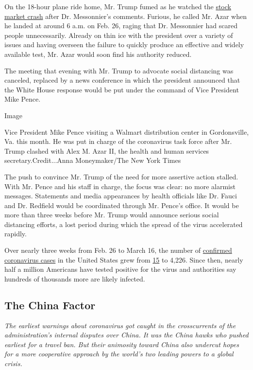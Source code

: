On the 18-hour plane ride home, Mr. Trump fumed as he watched the
\href{https://www.nytimes.com/2020/02/24/business/stock-market-coronavirus.html}{stock
market crash} after Dr. Messonnier's comments. Furious, he called Mr.
Azar when he landed at around 6 a.m. on Feb. 26, raging that Dr.
Messonnier had scared people unnecessarily. Already on thin ice with the
president over a variety of issues and having overseen the failure to
quickly produce an effective and widely available test, Mr. Azar would
soon find his authority reduced.

The meeting that evening with Mr. Trump to advocate social distancing
was canceled, replaced by a news conference in which the president
announced that the White House response would be put under the command
of Vice President Mike Pence.

Image

Vice President Mike Pence visiting a Walmart distribution center in
Gordonsville, Va. this month. He was put in charge of the coronavirus
task force after Mr. Trump clashed with Alex M. Azar II, the health and
human services secretary.Credit...Anna Moneymaker/The New York Times

The push to convince Mr. Trump of the need for more assertive action
stalled. With Mr. Pence and his staff in charge, the focus was clear: no
more alarmist messages. Statements and media appearances by health
officials like Dr. Fauci and Dr. Redfield would be coordinated through
Mr. Pence's office. It would be more than three weeks before Mr. Trump
would announce serious social distancing efforts, a lost period during
which the spread of the virus accelerated rapidly.

Over nearly three weeks from Feb. 26 to March 16, the number of
\href{https://www.nytimes.com/interactive/2020/us/coronavirus-us-cases.html\#map}{confirmed
coronavirus cases} in the United States grew from
\href{https://www.cdc.gov/media/releases/2020/s0226-Covid-19-spread.html}{15}
to 4,226. Since then, nearly half a million Americans have tested
positive for the virus and authorities say hundreds of thousands more
are likely infected.

\hypertarget{the-china-factor}{%
\subsection{The China Factor}\label{the-china-factor}}

\emph{The earliest warnings about coronavirus got caught in the
crosscurrents of the administration's internal disputes over China. It
was the China hawks who pushed earliest for a travel ban. But their
animosity toward China also undercut hopes for a more cooperative
approach by the world's two leading powers to a global crisis.}

